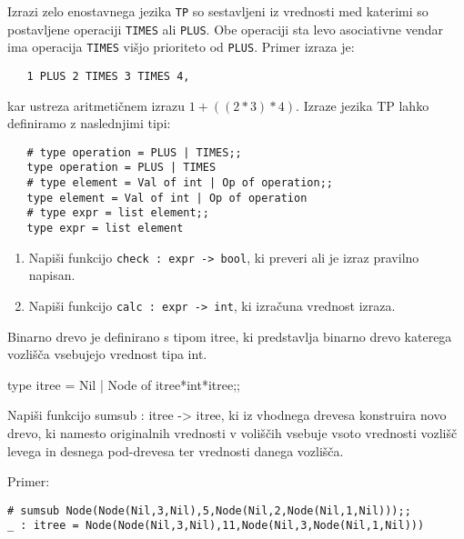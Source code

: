 \begin{ex}
   Izrazi zelo enostavnega jezika \lstinline{TP} so sestavljeni iz
   vrednosti med katerimi so postavljene operaciji \lstinline{TIMES} ali
   \lstinline{PLUS}. Obe operaciji sta levo asociativne vendar ima
   operacija \lstinline{TIMES} vi\v sjo prioriteto od
   \lstinline{PLUS}. Primer izraza je:

   \begin{lstlisting}
   1 PLUS 2 TIMES 3 TIMES 4,
   \end{lstlisting}

   kar ustreza aritmeti\v cnem izrazu $1 + ((2 * 3) * 4)$. Izraze jezika
   TP lahko definiramo z naslednjimi tipi:
 
   \begin{lstlisting}
   # type operation = PLUS | TIMES;; 
   type operation = PLUS | TIMES 
   # type element = Val of int | Op of operation;; 
   type element = Val of int | Op of operation
   # type expr = list element;;
   type expr = list element
   \end{lstlisting}

   \begin{enumerate}[label=(\roman*)]
   \item Napi\v si funkcijo \lstinline{check : expr -> bool}, ki preveri
     ali je izraz pravilno napisan.

   \item Napi\v si funkcijo \lstinline{calc : expr -> int}, ki izra\v
     cuna vrednost izraza.
   \end{enumerate}


\end{ex}
\begin{ex}
  Binarno drevo je definirano s tipom itree, ki predstavlja binarno
  drevo katerega vozli\v s\v ca vsebujejo vrednost tipa int.

  type itree = Nil | Node of itree*int*itree;;

  Napi\v si funkcijo sumsub : itree -> itree, ki iz vhodnega drevesa
  konstruira novo drevo, ki namesto originalnih vrednosti v voli\v s\v
  cih vsebuje vsoto vrednosti vozli\v s\v c levega in desnega
  pod-drevesa ter vrednosti danega vozli\v s\v ca.

\noindent\/Primer:
\begin{lstlisting}
# sumsub Node(Node(Nil,3,Nil),5,Node(Nil,2,Node(Nil,1,Nil)));;
_ : itree = Node(Node(Nil,3,Nil),11,Node(Nil,3,Node(Nil,1,Nil)))
\end{lstlisting}


\end{ex} 
